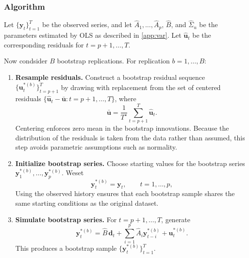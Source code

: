 \documentclass[11pt]{article}
\begin{document}
\subsubsection{Algorithm}

Let $\{\mathbf{y}_t\}_{t=1}^T$ be the observed series, and let
$\widehat{A}_1,\dots,\widehat{A}_p$, $\widehat{B}$, and
$\widehat{\Sigma}_u$ be the parameters estimated by OLS as described in
\cref{app:var}. Let $\widehat{\mathbf{u}}_t$ be the corresponding
residuals for $t = p+1,\dots,T$.

Now condsider $B$ bootstrap replications. For replication $b = 1,\dots,B$:

\begin{enumerate}[leftmargin=1.5em,label=\textbf{(B\arabic*)}]
  \item \textbf{Resample residuals.}
        Construct a bootstrap residual sequence
        $\{\mathbf{u}_t^{*(b)}\}_{t=p+1}^T$ by drawing with replacement from
        the set of centered residuals
        $\{\widehat{\mathbf{u}}_t - \bar{\mathbf{u}} : t=p+1,\dots,T\}$,
        where
        \begin{equation}
          \bar{\mathbf{u}}
          = \frac{1}{T^\star} \sum_{t=p+1}^T \widehat{\mathbf{u}}_t.
        \end{equation}
        Centering enforces zero mean in the bootstrap innovations. Because the
        distribution of the residuals is taken from the data rather than assumed,
        this step avoids parametric assumptions such as normality.

  \item \textbf{Initialize bootstrap series.}
        Choose starting values for the bootstrap series
        $\mathbf{y}_1^{*(b)},\dots,\mathbf{y}_p^{*(b)}$.
        Weset
        \begin{equation}
          \mathbf{y}_t^{*(b)} = \mathbf{y}_t,
          \qquad t = 1,\dots,p,
        \end{equation}
        Using the observed history ensures that each bootstrap sample shares the
        same starting conditions as the original dataset.

  \item \textbf{Simulate bootstrap series.}
        For $t = p+1,\dots,T$, generate
        \begin{equation}
          \mathbf{y}_t^{*(b)}
          = \widehat{B}\,\mathbf{d}_t
          + \sum_{i=1}^p \widehat{A}_i \mathbf{y}_{t-i}^{*(b)}
          + \mathbf{u}_t^{*(b)}.
          \label{eq:bootstrap-sim}
        \end{equation}
        This produces a bootstrap sample $\{\mathbf{y}_t^{*(b)}\}_{t=1}^T$.


\end{enumerate}
\end{document}
